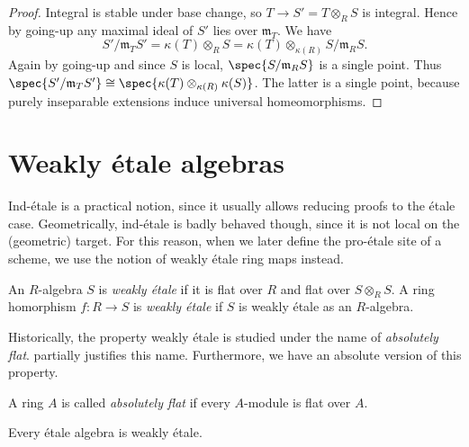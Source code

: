 \begin{proof}
    Integral is stable under base change, so $T \to S' = T \otimes_{R} S$ is integral. Hence by going-up
    any maximal ideal of $S'$ lies over $\mathfrak{m}_T$. We have
    \[
        S' / \mathfrak{m}_T S' = \kappa(T) \otimes_{R} S = \kappa(T) \otimes_{\kappa(R)} S / \mathfrak{m}_R S
    .\] Again by going-up and since $S$ is local, $\spec{S / \mathfrak{m}_R S}$ is
    a single point. Thus $\spec{S' / \mathfrak{m}_T S'} \cong \spec{\kappa(T) \otimes_{\kappa(R)} \kappa(S)}$.
    The latter is a single point, because purely inseparable extensions induce
    universal homeomorphisms.
\end{proof}

\section{Weakly étale algebras}

Ind-étale is a practical notion, since it usually allows reducing proofs to the étale case. Geometrically,
ind-étale is badly behaved though, since it is not local on the (geometric) target. For this reason, when we later
define the pro-étale site of a scheme, we use the notion of weakly étale ring maps instead.

\begin{definition}
    An $R$-algebra $S$ is \emph{weakly étale} if it is flat over $R$ and flat over $S \otimes_{R} S$.
    A ring homorphism $f \colon R \to S$ is \emph{weakly étale} if $S$ is weakly étale as an $R$-algebra.
    \label{def:weakly-etale-algebra}
    \leanok
\end{definition}

Historically, the property weakly étale is studied under the name of \emph{absolutely flat}. 
 partially justifies this name. Furthermore, we have an absolute version 
of this property.

\begin{definition}
    \label{def:absolutely-flat}
    A ring $A$ is called \emph{absolutely flat} if every $A$-module is flat over $A$. 
    \leanok
\end{definition}

\begin{lemma}
    Every étale algebra is weakly étale.
    \label{lemma:etale-weakly-etale-algebra}
    \leanok
    \mathlibok
\end{lemma}

